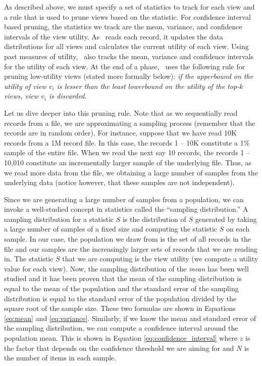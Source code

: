 As described above, we must specify
a set of statistics to track for each view and a rule that is used to
prune views based on the statistic.
For confidence interval based pruning, the statistics we track are the mean, 
variance, and confidence intervals of the view utility.
As \VizRecDB\ reads each record, it updates the data
distributions for all views and calculates the current utility of each view. 
Using past measures of utility, \VizRecDB\ also tracks the mean,
variance and confidence intervals for the utility of each view.
At the end of a phase, \VizRecDB\ uses the following rule for pruning low-utility
views (stated more formally below): {\it if the upperbound on the utility
of view $v_i$ is lesser than the least lowerbound on the utility of the
top-$k$ views, view $v_i$ is discarded.}

Let us dive deeper into this pruning rule.
Note that as we sequentially read records from a file, we are
approximating a sampling process (remember that the records are in random order).
For instance, suppose that we have read 10K records from a 1M record file.
In this case, the records 1 -- 10K constitute a 1\% sample of the entire file.
When we read the next say 10 records, the records 1 -- 10,010 constitute an
incrementally larger sample of the underlying file.
Thus, as we read more data from the file, we obtaining a large
number of samples from the underlying data (notice however, that these samples
are not independent).

Since we are generating a large number of samples from a population, we can
invoke a well-studied concept in statistics called the ``sampling distribution.'' 
A sampling distribution for a statistic $S$ is the distribution of
$S$ generated by taking a large number of samples of a fixed size and computing
the statistic $S$ on each sample.
In our case, the population we draw from is the set of all records in the file
and our samples are the increasingly larger sets of records that we are reading in.
The statistic $S$ that we are computing is the view utility (we
compute a utility value for each view).
Now, the sampling distribution of the {\it mean} has been well studied and it
has been proven that the mean of the sampling distribution is equal to the mean of the
population and the standard error of the sampling distribution is equal to the
standard error of the population divided by the square root of the sample size. 
These two formulas are shown in Equations \ref{eq:mean} and \ref{eq:variance}.
Similarly, if we know the mean and standard error of the sampling distribution,
we can compute a confidence interval around the population mean. This is shown
in Equation \ref{eq:confidence_interval} where $z$ is the factor that depends on the
confidence threshold we are aiming for and $N$ is the number of items
in each sample.

